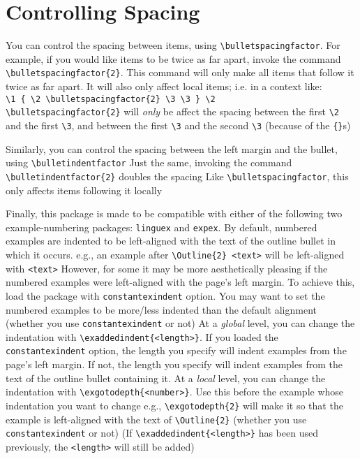 \documentclass[11pt]{article}
\begin{document}
\section{Controlling Spacing}\label{sec: spacing}
\1 You can control the spacing between items, using \verb+\bulletspacingfactor+.	
	\2 For example, if you would like items to be twice as far apart, invoke the command \verb+\bulletspacingfactor{2}+.
	\2 This command will only make all items that follow it twice as far apart.
	\2 It will also only affect local items; i.e. in a context like:\\
	\phantom{xxx}\verb+\1 { \2 \bulletspacingfactor{2} \3 \3 } \2+\\
	\verb+\bulletspacingfactor{2}+ will \textit{only} be affect the spacing between the first \verb+\2+ and the first \verb+\3+, and between the first \verb+\3+ and the second \verb+\3+ (because of the \verb+{}+s)

\1 Similarly, you can control the spacing between the left margin and the bullet, using \verb+\bulletindentfactor+
	\2 Just the same, invoking the command \verb+\bulletindentfactor{2}+ doubles the spacing
	\2 Like \verb+\bulletspacingfactor+, this only affects items following it locally


\1 Finally, this package is made to be compatible with either of the following two example-numbering packages: \verb+linguex+ and \verb+expex+.
	\2 By default, numbered examples are indented to be left-aligned with the text of the outline bullet in which it occurs.
		\3 e.g., an example after \verb+\Outline{2} <text>+ will be left-aligned with \verb+<text>+
	\2 However, for some it may be more aesthetically pleasing if the numbered examples were left-aligned with the page's left margin.
		\3 To achieve this, load the package with \verb+constantexindent+ option.
	\2 You may want to set the numbered examples to be more/less indented than the default alignment (whether you use \verb+constantexindent+ or not)
		\3 At a \textit{global} level, you can change the indentation with \verb+\exaddedindent{<length>}+.
			\4 If you loaded the \verb+constantexindent+ option, the length you specify will indent examples from the page's left margin.
			\4 If not, the length you specify will indent examples from the text of the outline bullet containing it.
		\3 At a \textit{local} level, you can change the indentation with  \verb+\exgotodepth{<number>}+.
			\4 Use this before the example whose indentation you want to change
			\4 e.g., {\verb+\exgotodepth{2}+} will make it so that the example is left-aligned with the text of \verb+\Outline{2}+ (whether you use \verb+constantexindent+ or not)
			\4 (If \verb+\exaddedindent{<length>}+ has been used previously, the \verb+<length>+ will still be added)
\end{document}
